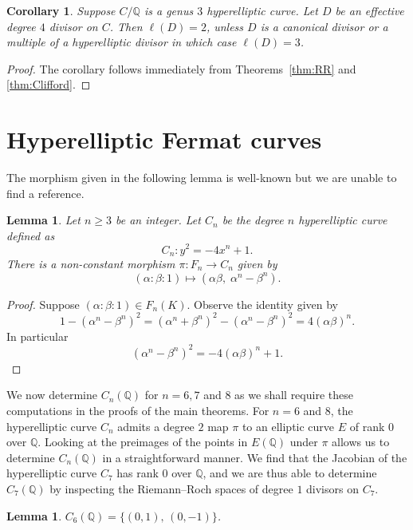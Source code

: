 \documentclass{amsart}
\newtheorem{lem}[thm]{Lemma}
\newtheorem{cor}[thm]{Corollary}
\theoremstyle{definition}
\newcommand{\Q}{\mathbb{Q}}
\begin{document}
\begin{cor}\label{cor:degree4}
    Suppose $C/\Q$ is a genus $3$ hyperelliptic curve.
    Let $D$ be an effective degree $4$ divisor on $C$. 
    Then $\ell(D)=2$, unless $D$ is a canonical divisor or a multiple of a hyperelliptic divisor in which case $\ell(D)=3$. 
\end{cor}

\begin{proof}
    The corollary follows immediately from Theorems~\ref{thm:RR} and \ref{thm:Clifford}. 
\end{proof}

\section{Hyperelliptic Fermat curves}\label{sec:hyperellipticFermat}

The morphism given in the following lemma is well-known but we are unable to find a reference. 

\begin{lem}
    \label{lem:hyperellipticlem}
    Let $n\geq 3$ be an integer. 
    Let $C_n$ be the degree $n$ hyperelliptic curve defined as
    \[
        C_{n}: y^2 = -4x^n + 1.
    \]
    There is a non-constant morphism 
    $\pi: F_n\rightarrow C_n$ given by 
    \[
    (\alpha:\beta:1)\mapsto (\alpha\beta,\; \alpha^n-\beta^n).
    \]
\end{lem}

\begin{proof}
    Suppose $(\alpha:\beta:1)\in F_{n}(K)$. 
    Observe the identity given by
    \[
        1 - (\alpha^n - \beta^n)^2 
        = 
        (\alpha^n + \beta^n)^2 - 
        (\alpha^n - \beta^n)^2 
        = 4(\alpha\beta)^n.
    \]
    In particular
    \[
    (\alpha^n-\beta^n)^2 = -4(\alpha\beta)^n +1.
    \]
\end{proof}

We now determine $C_n(\Q)$ for $n=6, 7$ and $8$ as we shall require these computations in the proofs 
of the main theorems. For $n=6$ and $8$, the hyperelliptic curve $C_n$ admits a degree $2$ map $\pi$ 
to an elliptic curve $E$ of rank $0$ over $\Q$. Looking at the preimages of the points in $E(\Q)$ under 
$\pi$ allows us to determine $C_n(\Q)$ in a straightforward manner. We find that the Jacobian of the hyperelliptic curve 
$C_7$ has rank $0$ over $\Q$, and we are thus able to determine $C_7(\Q)$ by inspecting the Riemann--Roch spaces of degree 
$1$ divisors on $C_7$.

\begin{lem}\label{lem:C6rational}
    $C_6(\Q) = \{(0,1),\, (0,-1)\}$.
\end{lem}
\end{document}

